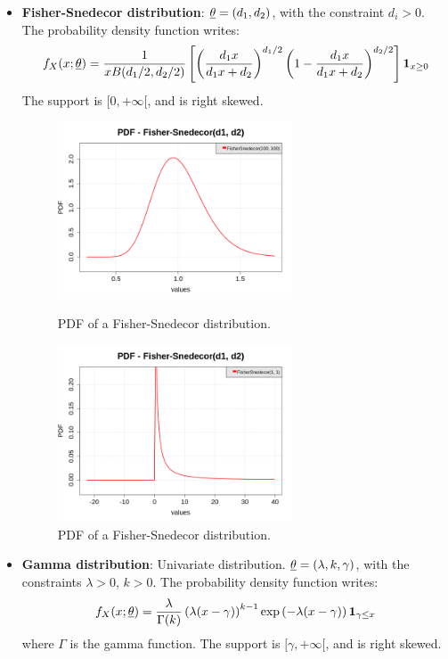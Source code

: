 {\begin{itemize}
\item {\bf Fisher-Snedecor distribution}: ${\underline{\theta}} = \left(d_1, d_2 \right)$, with the constraint $d_i>0$. The probability density function writes:
\begin{equation}
f_X(x;{\underline{\theta}}) = \displaystyle \frac{1}{xB(d_1/2, d_2/2)}\left[\left(\frac{d_1x}{d_1x+d_2}\right)^{d_1/2} \left(1-\frac{d_1x}{d_1x+d_2}\right)^{d_2/2} \right]\mathbf{1}_{x \geq 0}
\end{equation}
The support is $[0,+\infty[$, and is right skewed.

\begin{figure}[H]
\begin{minipage}{8cm}
\begin{center}
\includegraphics[width=7cm]{Figures/pdf_FisherSnedecor_1.png}
\caption{PDF of a Fisher-Snedecor distribution.}
\end{center}
\end{minipage}
\hfill
\begin{minipage}{8cm}
\begin{center}
\includegraphics[width=7cm]{Figures/pdf_FisherSnedecor_2.png}
\caption{PDF of a Fisher-Snedecor distribution.}
\end{center}
\end{minipage}
\end{figure}



\item {\bf Gamma distribution}: Univariate distribution. ${\underline{\theta}} = \left( \lambda, k, \gamma \right)$, with the constraints  $\lambda>0$, $k>0$. The probability density function writes:
\begin{equation}
f_X(x;{\underline{\theta}}) = \frac{\lambda}{\Gamma(k)} \left( \lambda(x-\gamma) \right)^{k-1} \exp \left( -\lambda(x-\gamma) \right) \mathbf{1}_{\gamma \leq x}
\end{equation}
where $\Gamma$ is the gamma function. The support is $[\gamma,+\infty[$, and is right skewed.



\end{itemize}}
